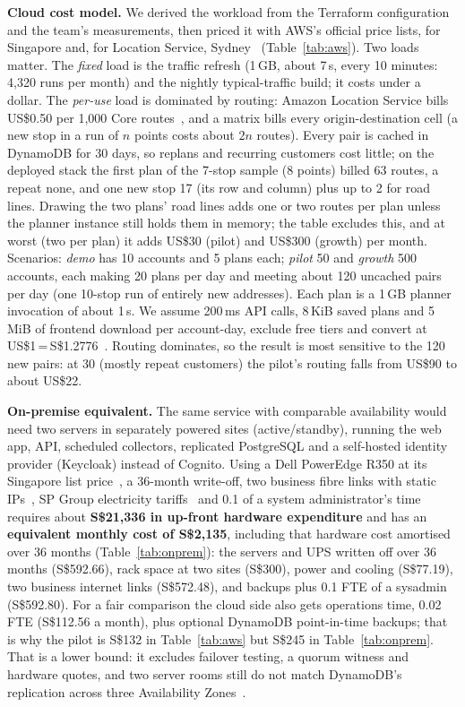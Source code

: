 \documentclass[10.5pt,a4paper]{article}
\newcommand{\Sd}{S\$}
\begin{document}
\textbf{Cloud cost model.} We derived the workload from the Terraform configuration and the team's measurements, then
priced it with AWS's official price lists, for Singapore and, for Location Service, Sydney~\cite{awsprice}
(Table~\ref{tab:aws}). Two loads matter. The \emph{fixed} load is the traffic refresh (1\,GB, about 7\,s, every 10 minutes:
4,320 runs per month) and the nightly typical-traffic build; it costs under a dollar. The \emph{per-use} load is dominated by
routing: Amazon Location Service bills US\$0.50 per 1,000 Core routes~\cite{awsloc}, and a matrix bills every origin-destination cell
(a new stop in a run of $n$ points costs about $2n$ routes). Every pair is cached in DynamoDB for 30 days, so replans and
recurring customers cost little; on the deployed stack the first plan of the 7-stop sample (8 points) billed 63 routes, a
repeat none, and one new stop 17 (its row and column) plus up to 2 for road lines. Drawing the two plans' road lines adds one or two routes per plan unless the planner
instance still holds them in memory; the table excludes this, and at worst (two per plan) it adds US\$30 (pilot) and
US\$300 (growth) per month. Scenarios: \emph{demo} has 10 accounts and 5 plans each; \emph{pilot} 50 and \emph{growth} 500 accounts, each
making 20 plans per day and meeting about 120 uncached pairs per day (one 10-stop run of entirely new addresses). Each plan
is a 1\,GB planner invocation of about 1\,s. We assume 200\,ms API calls, 8\,KiB saved plans and 5\,MiB of frontend download
per account-day, exclude free tiers and convert at US\$1\,=\,\Sd1.2776~\cite{fx}. Routing dominates, so the result is
most sensitive to the 120 new pairs: at 30 (mostly repeat customers) the pilot's routing falls from US\$90 to about US\$22.

\textbf{On-premise equivalent.} The same service with comparable availability would need two servers in separately powered
sites (active/standby), running the web app, API, scheduled collectors, replicated PostgreSQL and a self-hosted identity
provider (Keycloak) instead of Cognito. Using a Dell PowerEdge R350 at its Singapore list price~\cite{dell}, a 36-month write-off,
two business fibre links with static IPs~\cite{sptel}, SP Group electricity tariffs~\cite{sp} and 0.1 of a system
administrator's time~\cite{indeed} requires about \textbf{\Sd21,336 in up-front hardware expenditure} and has an \textbf{equivalent monthly cost of \Sd2,135}, including that hardware cost amortised over 36 months (Table~\ref{tab:onprem}):
the servers and UPS written off over 36 months (\Sd592.66), rack space at two sites (\Sd300), power and cooling (\Sd77.19),
two business internet links (\Sd572.48), and backups plus 0.1 FTE of a sysadmin (\Sd592.80). For a fair comparison the cloud
side also gets operations time, 0.02 FTE (\Sd112.56 a month), plus optional DynamoDB point-in-time backups; that is why the
pilot is \Sd132 in Table~\ref{tab:aws} but \Sd245 in Table~\ref{tab:onprem}.
That is a lower bound: it excludes failover testing, a quorum witness and hardware quotes, and two server rooms still do not
match DynamoDB's replication across three Availability Zones~\cite{ddbrepl}.
\end{document}
